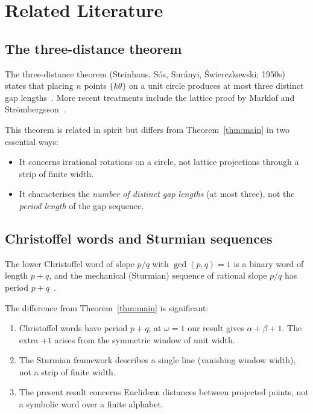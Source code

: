 \documentclass[11pt]{article}
\theoremstyle{plain}
\theoremstyle{definition}
\theoremstyle{remark}
\begin{document}
\section{Related Literature}\label{sec:literature}

\subsection{The three-distance theorem}

The three-distance theorem (Steinhaus, S\'{o}s, Sur\'{a}nyi,
\'{S}wierczkowski; 1950s) states that placing $n$ points $\{k\theta\}$
on a unit circle produces at most three distinct gap
lengths~\cite{ThreeGap, BertheReutenauer2024}.
More recent treatments include the lattice proof by Marklof and
Str\"{o}mbergsson~\cite{MarklofStrombergsson2017}.

This theorem is related in spirit but differs from
Theorem~\ref{thm:main} in two essential ways:
\begin{itemize}
    \item It concerns irrational rotations on a circle, not lattice
          projections through a strip of finite width.
    \item It characterises the \emph{number of distinct gap lengths}
          (at most three), not the \emph{period length} of the gap sequence.
\end{itemize}

\subsection{Christoffel words and Sturmian sequences}

The lower Christoffel word of slope $p/q$ with $\gcd(p,q)=1$ is a binary
word of length $p+q$, and the mechanical (Sturmian) sequence of rational
slope $p/q$ has period $p+q$~\cite{BerstelEtAl2008}.

The difference from Theorem~\ref{thm:main} is significant:
\begin{enumerate}
    \item Christoffel words have period $p+q$; at $\omega = 1$ our result
          gives $\alpha+\beta+1$.  The extra $+1$ arises from the symmetric
          window of unit width.
    \item The Sturmian framework describes a single line (vanishing window
          width), not a strip of finite width.
    \item The present result concerns Euclidean distances between projected
          points, not a symbolic word over a finite alphabet.
\end{enumerate}
\end{document}
